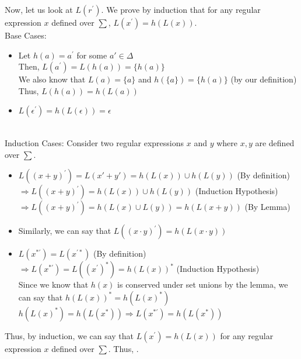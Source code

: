 \documentclass[12pt,a4paper]{article}
\begin{document}
Now, let us look at $L(r^{'})$. We prove by induction that for any regular expression $x$ defined over $\sum$, $L(x^{'}) = h(L(x))$.
\\Base Cases:
\begin{itemize}
\item Let $h(a) = a^{'} $ for some $a' \in \Delta$
\\Then, $L(a^{'}) = L(h(a)) = \{h(a)\}$
\\We also know that $L(a) = \{a\}$ and $h(\{a\}) = \{h(a)\}$ (by our definition)
\\Thus, $L(h(a)) = h(L(a))$
\item $L(\epsilon^{'}) = h(L(\epsilon)) = \epsilon$
\end{itemize}
\\Induction Cases:
Consider two regular expressions $x$ and $y$ where $x,y$ are defined over $\sum$.
\begin{itemize}
\item $L((x + y)^{'}) = L(x' + y') = h(L(x)) \cup h(L(y))$ (By definition)
\\ $\Rightarrow L((x + y)^{'}) = h(L(x)) \cup h(L(y))$ (Induction Hypothesis)
\\ $\Rightarrow L((x + y)^{'}) = h(L(x) \cup L(y)) = h(L(x + y))$ (By Lemma)
\item Similarly, we can say that $L((x\cdot y)^{'}) = h(L(x \cdot y))$
\item $L(x^{*'}) = L(x^{'*})$ (By definition)
\\ $ \Rightarrow  L(x^{*'}) = L((x^{'})^*) = h(L(x))^*$ (Induction Hypothesis)
\\ Since we know that $h(x)$ is conserved under set unions by the lemma, we can say that $h(L(x))^* = h(L(x)^*)$
\\ $h(L(x)^*) = h(L(x^*))\Rightarrow L(x^{*'}) = h(L(x^*))$
\end{itemize}
Thus, by induction, we can say that $L(x^{'}) = h(L(x))$ for any regular expression $x$ defined over $\sum$.
Thus, .
\unboldmath
\end{document}
